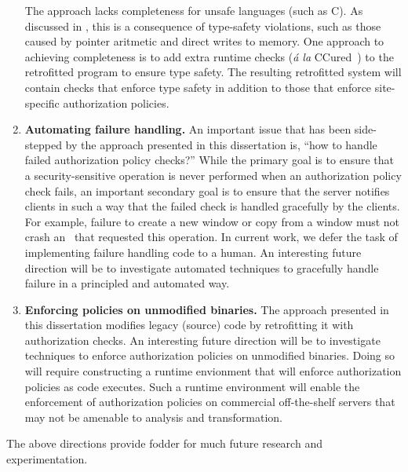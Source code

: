 \begin{enumerate}
The approach lacks completeness for unsafe languages (such as C). As discussed
in , this is a consequence of
type-safety violations, such as those caused by pointer aritmetic and direct
writes to memory. One approach to achieving completeness is to add extra
runtime checks (\textit{\'{a} la} CCured~\cite{nch+05,nmw02}) to the
retrofitted program to ensure type safety.  The resulting retrofitted system
will contain checks that enforce type safety in addition to those that enforce
site-specific authorization policies.
%
\item \textbf{Automating failure handling.} An important issue that has been
side-stepped by the approach presented in this dissertation is, ``how to handle
failed authorization policy checks?'' While the primary goal is to ensure that
a security-sensitive operation is never performed when an authorization policy
check fails, an important secondary goal is to ensure that the server notifies
clients in such a way that the failed check is handled gracefully by the
clients. For example, failure to create a new window or copy from a window must
not crash an \xclient\ that requested this operation. In current work, we defer
the task of implementing failure handling code to a human. An interesting
future direction will be to investigate automated techniques to gracefully
handle failure in a principled and automated way.
%
\item \textbf{Enforcing policies on unmodified binaries.} The approach
presented in this dissertation modifies legacy (source) code by retrofitting it
with authorization checks. An interesting future direction will be to
investigate techniques to enforce authorization policies on unmodified
binaries. Doing so will require constructing a runtime envionment that will
enforce authorization policies as code executes. Such a runtime environment
will enable the enforcement of authorization policies on commercial
off-the-shelf servers that may not be amenable to analysis and transformation.
% 
\end{enumerate}

The above directions provide fodder for much future research and
experimentation.
